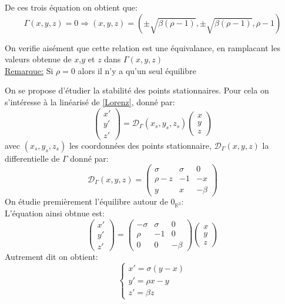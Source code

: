 \documentclass{article}
\newcommand*\colv[1]{
\left(\begin{array}{c}
    #1
\end{array}\right)
}
\newcommand{\R}{\mathbb{R}}
\begin{document}
De ces trois équation on obtient que:
\[
    \Gamma(x,y,z)=0 \Rightarrow (x,y,z) = (\pm \sqrt{ \beta (\rho -1)} ,\pm \sqrt{\beta (\rho -1)}, \rho -1)
\]

On verifie aisément que cette relation est une \'equivalance, en ramplacant les valeurs obtenue de $x$,$y$ et $z$ dans $\Gamma(x,y,z)$
\\
\underline{Remarque:} Si $\rho = 0$ alors il n'y a qu'un seul équilibre

On se propose d'étudier la stabilité des points stationnaires. Pour cela on s'intéresse à la linéarisé de \eqref{Lorenz}, donné par:
\[
\colv{x'\\y'\\z'} = \mathcal{D}_{\Gamma}(x_s,y_s,z_s)\colv{x\\y\\z}    
\]
avec $(x_s,y_s,z_s)$ les coordonnées des points stationnaire, $\mathcal{D}_{\Gamma}(x,y,z)$ la differentielle de $\Gamma$ donné par:
\[
\mathcal{D}_{\Gamma}(x,y,z) =
\begin{pmatrix}
    \sigma & \sigma & 0 \\ \rho - z & -1 & -x \\ y & x & - \beta
\end{pmatrix}
\]
On étudie premièrement l'équilibre autour de $0_{\R^3}$:\\
L'équation ainsi obtnue est:
\begin{equation}
    \colv{x'\\y'\\z'} =
    \begin{pmatrix}
        - \sigma & \sigma & 0 \\ \rho & -1 & 0 \\ 0 & 0 & - \beta
    \end{pmatrix}
    \colv{x \\ y \\ z}
\end{equation}
Autrement dit on obtient:
\begin{equation}
    \left\{\begin{array}{lr}
        x' = \sigma (y-x) \\
        y' = \rho x - y \\
        z' = \beta z
    \end{array}\right.
\end{equation}
\end{document}
